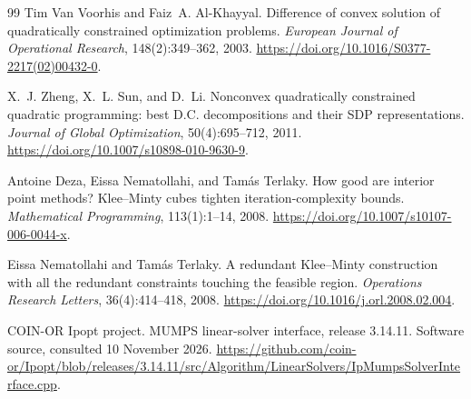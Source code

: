 \documentclass[pdflatex,sn-mathphys-num]{sn-jnl}
\theoremstyle{thmstyleone}
\theoremstyle{thmstylethree}
\begin{document}
\begin{thebibliography}{99}
Tim {Van Voorhis} and Faiz~A. Al-Khayyal.
\newblock Difference of convex solution of quadratically constrained
  optimization problems.
\newblock \emph{European Journal of Operational Research}, 148(2):349--362, 2003.
\newblock \url{https://doi.org/10.1016/S0377-2217(02)00432-0}.

X.~J. Zheng, X.~L. Sun, and D.~Li.
\newblock Nonconvex quadratically constrained quadratic programming: best D.C.
  decompositions and their SDP representations.
\newblock \emph{Journal of Global Optimization}, 50(4):695--712, 2011.
\newblock \url{https://doi.org/10.1007/s10898-010-9630-9}.

Antoine Deza, Eissa Nematollahi, and Tam\'as Terlaky.
\newblock How good are interior point methods? Klee--Minty cubes tighten
  iteration-complexity bounds.
\newblock \emph{Mathematical Programming}, 113(1):1--14, 2008.
\newblock \url{https://doi.org/10.1007/s10107-006-0044-x}.

Eissa Nematollahi and Tam\'as Terlaky.
\newblock A redundant Klee--Minty construction with all the redundant
  constraints touching the feasible region.
\newblock \emph{Operations Research Letters}, 36(4):414--418, 2008.
\newblock \url{https://doi.org/10.1016/j.orl.2008.02.004}.

COIN-OR Ipopt project.
\newblock MUMPS linear-solver interface, release 3.14.11.
\newblock Software source, consulted 10 November 2026.
\newblock \url{https://github.com/coin-or/Ipopt/blob/releases/3.14.11/src/Algorithm/LinearSolvers/IpMumpsSolverInterface.cpp}.

\end{thebibliography}\endgroup
\end{document}
